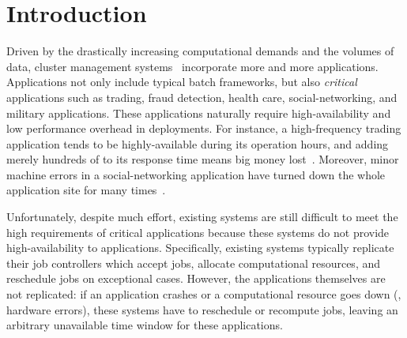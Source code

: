 \section{Introduction} \label{sec:intro}

Driven by the drastically increasing computational demands and the volumes of 
data, cluster 
management systems~\cite{borg:eurosys15,mesos:nsdi11,tupperware,yarn:socc13,
autopilot:sosp07,quincy:sosp09,apollo:osdi14,fuxi:vldb14} 
incorporate more and more applications. Applications not only include typical 
batch frameworks, but also \emph{critical} applications such as trading, fraud 
detection, health care, social-networking, and military applications. These 
applications naturally require high-availability and low performance overhead in 
deployments. For instance, a high-frequency trading application tends to be 
highly-available during its operation hours, and adding merely hundreds of \us 
to its response time means big money lost~\cite{nosql:finance}. Moreover, minor 
machine errors in a social-networking application have turned down the 
whole application site for many times~\cite{facebook:outage}.



Unfortunately, despite much effort, existing systems are still difficult to 
meet the high requirements of critical applications because these systems do 
not provide high-availability to applications. Specifically, existing 
systems typically replicate their job controllers which accept jobs, 
allocate computational resources, and reschedule jobs on exceptional cases. 
However, the applications themselves are not replicated: if an application 
crashes or a computational resource goes down (\eg, hardware errors), these 
systems have to reschedule or recompute jobs, leaving an arbitrary 
unavailable time window for these applications.

